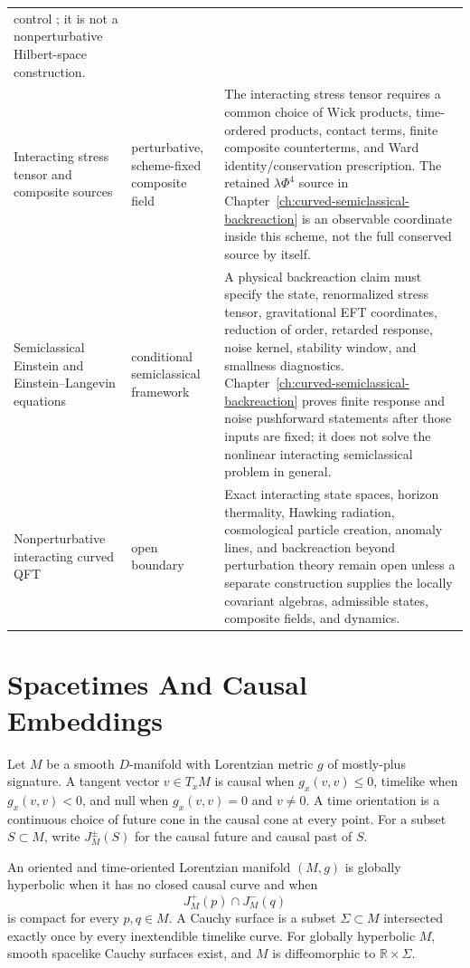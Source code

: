 \begin{center}
\begin{tabular}{@{}>{\raggedright\arraybackslash}p{}
  >{\raggedright\arraybackslash}p{}
  >{\raggedright\arraybackslash}p{}@{}}
control
\cite{HollandsWald2001LocalWick,HollandsWald2005Conservation,
HollandsWald2015QFCS}; it is not a nonperturbative Hilbert-space
construction. \\
Interacting stress tensor and composite sources
& perturbative, scheme-fixed composite field
& The interacting stress tensor requires a common choice of Wick products,
time-ordered products, contact terms, finite composite counterterms, and Ward
identity/conservation prescription.  The retained \(\lambda\Phi^4\) source in
Chapter~\ref{ch:curved-semiclassical-backreaction} is an observable coordinate
inside this scheme, not the full conserved source by itself. \\
Semiclassical Einstein and Einstein--Langevin equations
& conditional semiclassical framework
& A physical backreaction claim must specify the state, renormalized stress
tensor, gravitational EFT coordinates, reduction of order, retarded response,
noise kernel, stability window, and smallness diagnostics.
Chapter~\ref{ch:curved-semiclassical-backreaction} proves finite response and noise
pushforward statements after those inputs are fixed; it does not solve the
nonlinear interacting semiclassical problem in general. \\
Nonperturbative interacting curved QFT
& open boundary
& Exact interacting state spaces, horizon thermality, Hawking radiation,
cosmological particle creation, anomaly lines, and backreaction beyond
perturbation theory remain open unless a separate construction supplies the
locally covariant algebras, admissible states, composite fields, and dynamics.
\end{tabular}
\end{center}

\section{Spacetimes And Causal Embeddings}

Let \(M\) be a smooth \(D\)-manifold with Lorentzian metric \(g\) of
mostly-plus signature.  A tangent vector \(v\in T_xM\) is causal when
\(g_x(v,v)\le0\), timelike when \(g_x(v,v)<0\), and null when
\(g_x(v,v)=0\) and \(v\ne0\).  A time orientation is a continuous choice of
future cone in the causal cone at every point.  For a subset \(S\subset M\),
write \(J_M^\pm(S)\) for the causal future and causal past of \(S\).

\begin{definition}
\label{def:globally-hyperbolic-spacetime}
An oriented and time-oriented Lorentzian manifold \((M,g)\) is globally
hyperbolic when it has no closed causal curve and when
\[
  J_M^+(p)\cap J_M^-(q)
\]
is compact for every \(p,q\in M\).  A Cauchy surface is a subset
\(\Sigma\subset M\) intersected exactly once by every inextendible timelike
curve.  For globally hyperbolic \(M\), smooth spacelike Cauchy surfaces
exist, and \(M\) is diffeomorphic to \(\mathbb R\times\Sigma\).
\end{definition}

